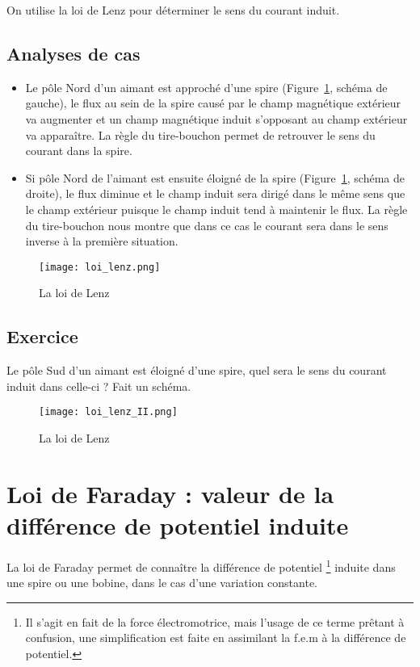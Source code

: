 On utilise la loi de Lenz pour déterminer le sens du courant induit.

\subsection{Analyses de cas}
\begin{itemize}
    \item Le pôle Nord d'un aimant est approché d'une spire (Figure~\ref{loi_lenz}, schéma de gauche), le flux au sein de la spire causé par le champ magnétique extérieur va augmenter et un champ magnétique induit s'opposant au champ extérieur va apparaître. La règle du tire-bouchon permet de retrouver le sens du courant dans la spire.
    \item Si pôle Nord de l'aimant est ensuite éloigné de la spire  (Figure~\ref{loi_lenz}, schéma de droite), le flux diminue et le champ induit sera dirigé dans le même sens que le champ extérieur puisque le champ induit tend à maintenir le flux. La règle du tire-bouchon nous montre que dans ce cas le courant sera dans le sens inverse à la première situation.
\end{itemize}

\newpage

\begin{figure}[ht]
    \centering
    \texttt{[image: loi\_lenz.png]}
    \caption{La loi de Lenz}
    \label{loi_lenz}
\end{figure}

\newpage

\subsection{Exercice}

\begin{exercise}
    Le pôle Sud d'un aimant est éloigné d'une spire, quel sera le sens du courant induit dans celle-ci ? Fait un schéma.
\end{exercise}

\begin{figure}[ht]
    \centering
    \texttt{[image: loi\_lenz\_II.png]}
    \caption{La loi de Lenz}
    \label{loi_lenz_2}
\end{figure}

\newpage

\section{Loi de Faraday : valeur de la différence de potentiel induite}
La loi de Faraday permet de connaître la différence de potentiel \footnote{Il s'agit en fait de la force électromotrice, mais l'usage de ce terme prêtant à confusion, une simplification est faite en assimilant la f.e.m à la différence de potentiel.} induite dans une spire ou une bobine, dans le cas d'une variation constante.

